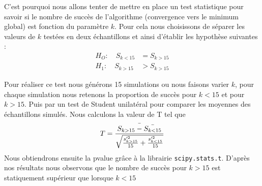 \documentclass[12pt]{article}
\begin{document}
C'est pourquoi nous allons tenter de mettre en place un test statistique pour savoir si le nombre de succès de l'algorithme (convergence vers le minimum global) est fonction du paramètre $k$. Pour cela nous choisissons de séparer les valeurs de $k$ testées en deux échantillons et ainsi d'établir les hypothèse suivantes :
\begin{align*}
    H_O : \quad S_{k<15} &=  S_{k>15} \\
    H_1 : \quad S_{k>15} &>  S_{k>15}
\end{align*}

Pour réaliser ce test nous générons 15 simulations ou nous faisons varier $k$, pour chaque simulation nous retenons la proportion de succès pour $k<15$ et pour $k>15$. Puis par un test de Student unilatéral pour comparer les moyennes des échantillons simulés. Nous calculons la valeur de T tel que $$T = \frac{\Bar{S_{k>15} - \Bar{S_{k<15}}}}{\sqrt{\frac{s'^2_{k>15}}{15} + \frac{s'^2_{k<15}}{15}}    }$$
Nous obtiendrons ensuite la pvalue grâce à la librairie \verb|scipy.stats.t|.
D'après nos résultats nous observons que le nombre de succès pour $k>15$ est statiquement supérieur que lorsque $k<15$


   
\end{document}
